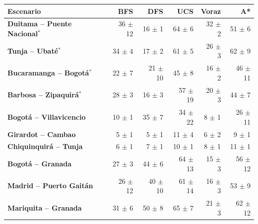 \renewcommand{\arraystretch}{1.2}
\begin{tabular}{|l|r|r|r|r|r|}
\hline
\rowcolor{gray!20} \textbf{Escenario} & \textbf{BFS} & \textbf{DFS} & \textbf{UCS} & \textbf{Voraz} & \textbf{A*} \\
\hline
\textbf{Duitama -- Puente Nacional$^{*}$} & 36 $\pm$ 12 & 16 $\pm$ 1 & 64 $\pm$ 6 & 32 $\pm$ 2 & 51 $\pm$ 6 \\
\hline
\textbf{Tunja -- Ubaté$^{*}$} & 34 $\pm$ 4 & 17 $\pm$ 2 & 61 $\pm$ 5 & 26 $\pm$ 3 & 62 $\pm$ 9 \\
\hline
\textbf{Bucaramanga -- Bogotá$^{*}$} & 22 $\pm$ 7 & 21 $\pm$ 10 & 45 $\pm$ 8 & 16 $\pm$ 2 & 46 $\pm$ 11 \\
\hline
\textbf{Barbosa -- Zipaquirá$^{*}$} & 28 $\pm$ 3 & 16 $\pm$ 3 & 57 $\pm$ 19 & 20 $\pm$ 3 & 44 $\pm$ 7 \\
\hline
\textbf{Bogotá -- Villavicencio} & 10 $\pm$ 1 & 35 $\pm$ 7 & 34 $\pm$ 22 & 8 $\pm$ 1 & 26 $\pm$ 11 \\
\hline
\textbf{Girardot -- Cambao} & 5 $\pm$ 1 & 5 $\pm$ 1 & 11 $\pm$ 4 & 6 $\pm$ 2 & 9 $\pm$ 1 \\
\hline
\textbf{Chiquinquirá -- Tunja} & 6 $\pm$ 1 & 7 $\pm$ 1 & 10 $\pm$ 1 & 8 $\pm$ 1 & 11 $\pm$ 1 \\
\hline
\textbf{Bogotá -- Granada} & 27 $\pm$ 3 & 44 $\pm$ 6 & 64 $\pm$ 13 & 15 $\pm$ 3 & 56 $\pm$ 12 \\
\hline
\textbf{Madrid -- Puerto Gaitán} & 26 $\pm$ 12 & 40 $\pm$ 10 & 61 $\pm$ 14 & 16 $\pm$ 3 & 53 $\pm$ 9 \\
\hline
\textbf{Mariquita -- Granada} & 31 $\pm$ 6 & 50 $\pm$ 8 & 65 $\pm$ 7 & 21 $\pm$ 3 & 62 $\pm$ 12 \\
\hline
\end{tabular}
